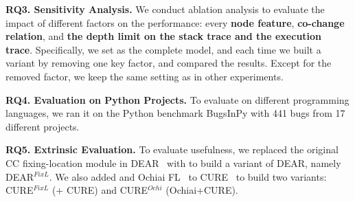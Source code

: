 {\bf RQ3. Sensitivity Analysis.}  We conduct ablation
analysis to evaluate the impact of different factors on the
performance: every {\bf node feature}, {\bf co-change
relation}, and {\bf the depth limit on the stack trace and the
execution trace}. Specifically, we set {\tool} as the complete model,
and each time we built a variant by removing one key factor,
and compared the results.
Except for the removed factor, we keep the same setting
as in other experiments.

{\bf RQ4. Evaluation on Python Projects.}
%
To evaluate {\tool} on different programming languages, we ran it on the Python benchmark BugsInPy \cite{BugsInPy,widyasari2020bugsinpy} with 441 bugs from 17 different projects.



{\bf RQ5. Extrinsic Evaluation.} To evaluate usefulness, we replaced
the original CC fixing-location module in DEAR~\cite{icse22} with
{\tool} to build a variant of DEAR, namely DEAR$^{FixL}$.  We also
added {\tool} and Ochiai FL~\cite{Ochiai} to CURE~\cite{cure-icse21}
to build two variants: CURE$^{FixL}$ (\tool + CURE) and CURE$^{Ochi}$
(Ochiai+CURE).




